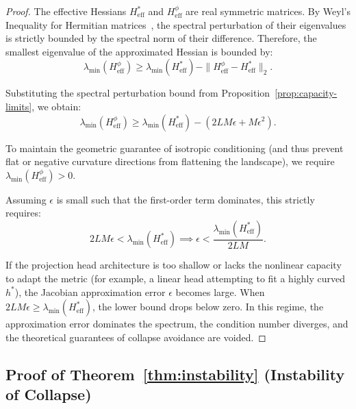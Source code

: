 \documentclass{article}
\theoremstyle{plain}
\theoremstyle{definition}
\theoremstyle{remark}
\begin{document}
\begin{proof}
The effective Hessians $H_{\text{eff}}^*$ and $H_{\text{eff}}^\phi$ are real symmetric matrices. By Weyl's Inequality for Hermitian matrices~\citep{stewart1990matrix}, the spectral perturbation of their eigenvalues is strictly bounded by the spectral norm of their difference. Therefore, the smallest eigenvalue of the approximated Hessian is bounded by:
\begin{equation*}
    \lambda_{\min}(H_{\text{eff}}^\phi) \ge \lambda_{\min}(H_{\text{eff}}^*) - \| H_{\text{eff}}^\phi - H_{\text{eff}}^* \|_2.
\end{equation*}

Substituting the spectral perturbation bound from Proposition~\ref{prop:capacity-limits}, we obtain:
\begin{equation*}
    \lambda_{\min}(H_{\text{eff}}^\phi) \ge \lambda_{\min}(H_{\text{eff}}^*) - (2 L M \epsilon + M \epsilon^2).
\end{equation*}

To maintain the geometric guarantee of isotropic conditioning (and thus prevent flat or negative curvature directions from flattening the landscape), we require $\lambda_{\min}(H_{\text{eff}}^\phi) > 0$. 

Assuming $\epsilon$ is small such that the first-order term dominates, this strictly requires:
\begin{equation*}
    2 L M \epsilon < \lambda_{\min}(H_{\text{eff}}^*) \implies \epsilon < \frac{\lambda_{\min}(H_{\text{eff}}^*)}{2 L M}.
\end{equation*}

If the projection head architecture is too shallow or lacks the nonlinear capacity to adapt the metric (for example, a linear head attempting to fit a highly curved $h^*$), the Jacobian approximation error $\epsilon$ becomes large. When $2LM\epsilon \ge \lambda_{\min}(H_{\text{eff}}^*)$, the lower bound drops below zero. In this regime, the approximation error dominates the spectrum, the condition number diverges, and the theoretical guarantees of collapse avoidance are voided.
\end{proof}

\subsection{Proof of Theorem~\ref{thm:instability} (Instability of Collapse)}
\end{document}
